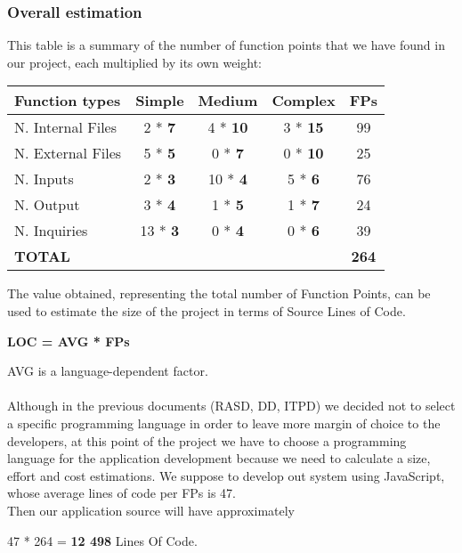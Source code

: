 \subsubsection{Overall estimation}

This table is a summary of the number of function points that we have found in our project, each multiplied by its own weight:

\begin{center}
	\begin{tabular}{|l|c|c|c||c|}
		\hline
		\textbf{Function types} 	& \textbf{Simple} 	& \textbf{Medium} 	& \textbf{Complex}	& \textbf{FPs} \\
		\hline
		N. Internal Files 	& 2 * \textbf{7} 	& 4 * \textbf{10} 	& 3 * \textbf{15} & 99 \\
		\hline
		N. External Files 	& 5 * \textbf{5} 	& 0 * \textbf{7} 	& 0 * \textbf{10} & 25 \\
		\hline
		N. Inputs 	& 2 * \textbf{3} 	& 10 * \textbf{4} 	& 5 * \textbf{6} & 76  \\
		\hline
		N. Output 	& 3 * \textbf{4} 	& 1 * \textbf{5} 	& 1 * \textbf{7} & 24 \\
		\hline
		N. Inquiries 	& 13 * \textbf{3} 	& 0 * \textbf{4} 	& 0 * \textbf{6}  & 39\\	
		\hline \hline
		\textbf{TOTAL} 	&  	& 	& 	& \textbf{264} \\
		\hline
	\end{tabular}
\end{center}

The value obtained, representing the total number of Function Points, can be used to estimate the size of the project in terms of Source Lines of Code. \\
\begin{center}
	\textbf{LOC = AVG * FPs}
\end{center}
AVG is a language-dependent factor. \\
\\
Although in the previous documents (RASD, DD, ITPD) we decided not to select a specific programming language in order to leave more margin of choice to the developers, at this point of the project we have to choose a programming language for the application development because we need to calculate a size, effort and cost estimations.
We suppose to develop out system using JavaScript, whose average lines of code per FPs is 47.\\
Then our application source will have approximately 
\begin{center}
	47 * 264 = \textbf{12 498} Lines Of Code.
\end{center}
